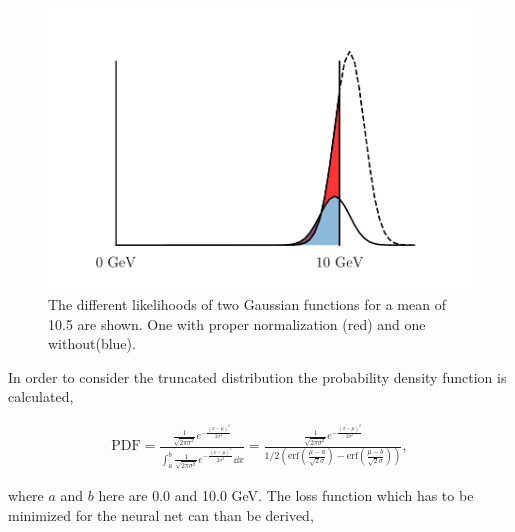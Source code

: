 \documentclass[12pt, a4paper]{thesis}
\begin{document}
\begin{figure}[H]
  \centering
  \includegraphics[width=.9\linewidth]{../images/gaussian_shift.png}
  \caption{The different likelihoods of two Gaussian functions for a
    mean of 10.5 are shown. One with proper normalization (red) and
    one without(blue).}
  \label{gaussian-shift}
\end{figure}

In order to consider the truncated distribution the probability
density function is calculated,

\begin{align}
\text{PDF} = \frac{\frac{1}{\sqrt{2\pi \sigma^2}}
  e^{-\frac{(x-\mu)^2}{2 \sigma^2}}}{\int^b_a \frac{1}{\sqrt{2\pi
      \sigma^2}} e^{-\frac{(x-\mu)^2}{2 \sigma^2}} \dd x} =
\frac{\frac{1}{\sqrt{2\pi \sigma^2}} e^{-\frac{(x-\mu)^2}{2
      \sigma^2}}}{1/2\left(\text{erf}\left(\frac{\mu-a}{\sqrt{2}\sigma}\right)
  - \text{erf}\left(\frac{\mu-b}{\sqrt{2}\sigma}\right)\right)},
\end{align}

where \(a\) and \(b\) here are 0.0 and 10.0 GeV. The loss function
which has to be minimized for the neural net can than be derived,
\end{document}
